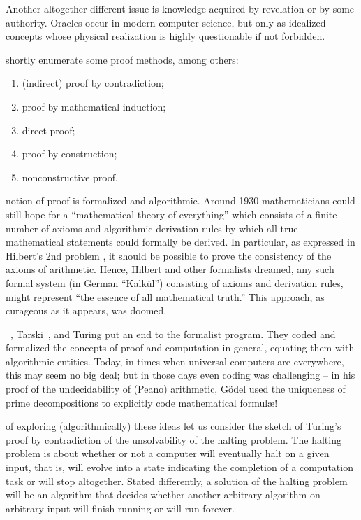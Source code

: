 Another altogether different issue is knowledge acquired by revelation or by some authority.
Oracles occur in modern computer science,
but only as idealized concepts whose physical realization is highly
questionable if not forbidden.

 shortly enumerate some proof methods, among others:
\begin{enumerate}
\item
(indirect) proof by contradiction;
\item
proof by mathematical induction;
\item
direct proof;
\item
proof by construction;
\item
nonconstructive proof.
\end{enumerate}


 notion of proof is formalized and algorithmic.
Around 1930 mathematicians could still hope for a
``mathematical theory of everything''
which consists of a finite number of axioms and algorithmic derivation rules
by which all true mathematical statements could formally be derived.
In particular, as expressed in Hilbert's 2nd problem \citep{hilbert-1900e},
it should be possible to prove the consistency of the axioms of arithmetic.
Hence, Hilbert and other formalists dreamed, any such formal system (in German
``Kalk\"ul'') consisting of axioms and derivation rules, might
represent ``the essence of all mathematical truth.''
This approach, as curageous as it appears, was doomed.

~\cite{godel1}, Tarski~\cite{tarski:32}, and Turing
\cite{turing-36} put an end to the formalist program.
They coded and  formalized the concepts of proof and computation in general,
equating them with algorithmic entities.
Today, in times when universal computers are everywhere, this may seem no big deal;
but in those days even coding was challenging -- in his proof
of the undecidability of (Peano) arithmetic,
G\"odel used the uniqueness of prime decompositions to explicitly code mathematical formul\ae!

 of exploring (algorithmically) these ideas
let us consider the sketch of Turing's proof by contradiction
of the unsolvability of the halting problem.
The halting problem is about whether or not a computer will eventually halt on a given input,
that is, will evolve into a state indicating the completion of a computation task or will stop altogether.
Stated differently, a solution of the halting problem will be an algorithm that
decides whether another arbitrary algorithm on arbitrary input will finish running or will run forever.

